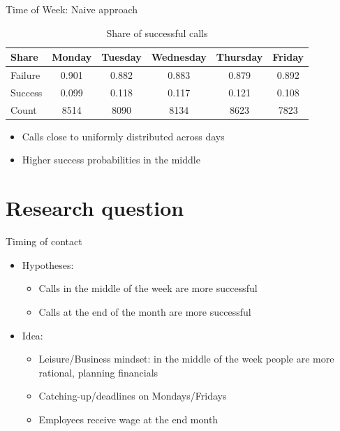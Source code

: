 \documentclass{beamer}
\begin{document}
\begin{frame}{Time of Week: Naive approach}
\begin{table}[ht]
\centering
\begin{tabular}{lccccc}
\hline
\textbf{Share} & \textbf{Monday} & \textbf{Tuesday} & \textbf{Wednesday} & \textbf{Thursday} & \textbf{Friday} \\
\hline
Failure & 0.901 & 0.882 & 0.883 & 0.879 & 0.892 \\
Success & 0.099 & 0.118 & 0.117 & 0.121 & 0.108 \\
Count & 8514 & 8090 & 8134 & 8623 & 7823\\
\hline
\end{tabular}
\caption{Share of successful calls}
\end{table}
\begin{itemize}
    \item Calls close to uniformly distributed across days
    \item Higher success probabilities in the middle
\end{itemize}
\end{frame}


\section{Research question}
\begin{frame}{Timing of contact}
\begin{itemize}
    \item Hypotheses:
    \begin{itemize}
\item Calls in the middle of the week are more successful
\item Calls at the end of the month are more successful
\end{itemize}
     
    \item Idea:
    \begin{itemize}
        \item Leisure/Business mindset: in the middle of the week people are more rational, planning financials
        \item Catching-up/deadlines on Mondays/Fridays 
        \item Employees receive wage at the end month 
    \end{itemize}
\end{itemize}

\end{frame}
\end{document}
